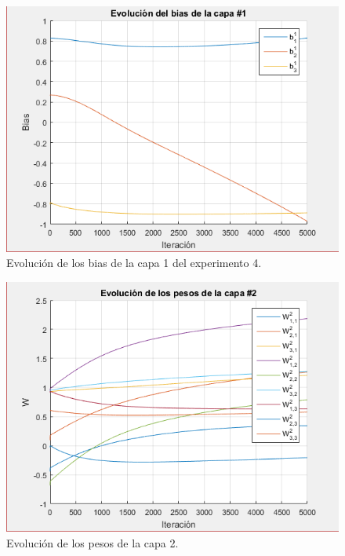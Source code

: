 \begin{figure}[H]
    \begin{center}
        \includegraphics[width=12cm]{4/bias1.png}
        \caption{Evolución de los bias de la capa 1 del experimento 4.}
        \label{fig:bias8}
    \end{center}
\end{figure}

\begin{figure}[H]
    \begin{center}
        \includegraphics[width=12cm]{4/pesos2.png}
        \caption{Evolución de los pesos de la capa 2.}
        \label{fig:pesos9}
    \end{center}
\end{figure}

